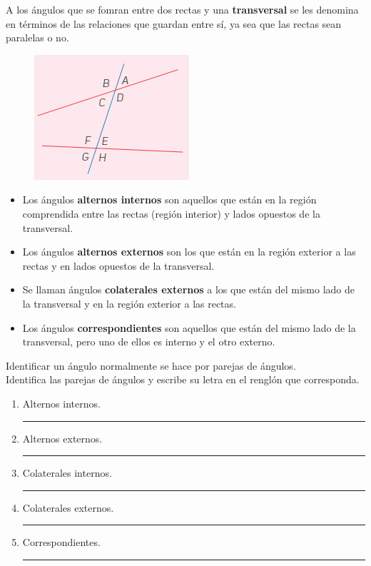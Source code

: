 \newpage
A los ángulos que se fomran entre dos rectas y una \textbf{transversal} se les denomina en términos de las relaciones que guardan entre sí, ya sea que las rectas sean paralelas o no.
\begin{figure}[H]
    \centering
    \includegraphics[scale=1.5]{Imagenes/Angulos_03.png}
\end{figure}
\begin{itemize}
\item Los ángulos \textbf{alternos internos} son aquellos que están en la región comprendida entre las rectas (región interior) y lados opuestos de la transversal.
\item Los ángulos \textbf{alternos externos} son los que están en la región exterior a las rectas y en lados opuestos de la transversal.
\item Se llaman ángulos \textbf{colaterales externos} a los que están del mismo lado de la transversal y en la región exterior a las rectas.
\item Los ángulos \textbf{correspondientes} son aquellos que están del mismo lado de la transversal, pero uno de ellos es interno y el otro externo. 
\end{itemize}
Identificar un ángulo normalmente se hace por parejas de ángulos.
\\
\noindent
Identifica las parejas de ángulos y escribe su letra en el renglón que corresponda.
\begin{multicols}{2}
\begin{enumerate}[label=\alph*)]
\item Alternos internos. \rule{2cm}{0.1mm}
\item Alternos externos. \rule{2cm}{0.1mm}
\item Colaterales internos. \rule{2cm}{0.1mm}
\columnbreak
\item Colaterales externos. \rule{2cm}{0.1mm}
\item Correspondientes. \rule{2cm}{0.1mm}
\end{enumerate}
\end{multicols}

